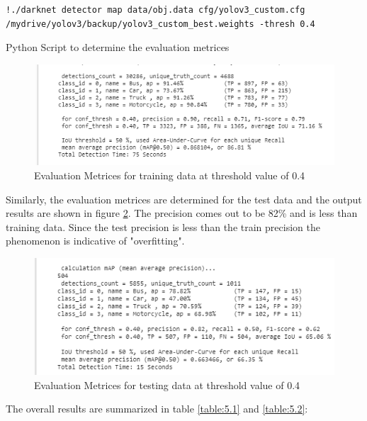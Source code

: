 \begin{longlisting}
\begin{verbatim}
!./darknet detector map data/obj.data cfg/yolov3_custom.cfg 
/mydrive/yolov3/backup/yolov3_custom_best.weights -thresh 0.4
\end{verbatim}
\caption{Python Script to determine the evaluation metrices}
\label{listing:20}
\end{longlisting}
\begin{figure}[H]
\centering
\captionsetup{justification = centering}
\includegraphics[scale= 0.8]{CHAPTERS/Chapter-5/images/5.10.PNG}
\caption{Evaluation Metrices for training data at threshold value of 0.4}
\label{fig:5.10}
\end{figure}
\noindent
Similarly, the evaluation metrices are determined for the test data and the output results are shown in figure \ref{fig:5.11}. The precision comes out to be 82\% and is less than training data. Since the test precision is less than the train precision the phenomenon is indicative of "overfitting".
\begin{figure}[H]
\centering
\captionsetup{justification = centering}
\includegraphics[scale= 0.8]{CHAPTERS/Chapter-5/images/5.11.PNG}
\caption{Evaluation Metrices for testing data at threshold value of 0.4}
\label{fig:5.11}
\end{figure}
The overall results are summarized in table \ref{table:5.1} and \ref{table:5.2}:

